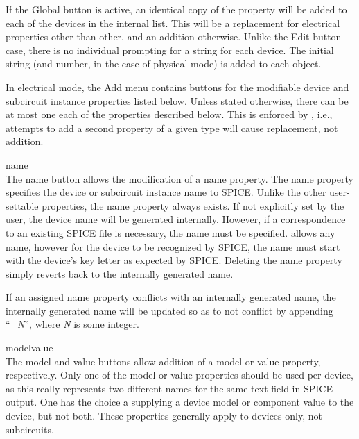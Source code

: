 If the {\cb Global} button is active, an identical copy of the
property will be added to each of the devices in the internal list. 
This will be a replacement for electrical properties other than {\et
other}, and an addition otherwise.  Unlike the {\cb Edit} button case,
there is no individual prompting for a string for each device.  The
initial string (and number, in the case of physical mode) is added to
each object.

In electrical mode, the {\cb Add} menu contains buttons for the
modifiable device and subcircuit instance properties listed below. 
Unless stated otherwise, there can be at most one each of the
properties described below.  This is enforced by {\Xic}, i.e.,
attempts to add a second property of a given type will cause
replacement, not addition.

\begin{description}
\item{\cb name}\\
The {\cb name} button allows the modification of a {\et name}
property.  The {\et name} property specifies the device or subcircuit
instance name to SPICE.  Unlike the other user-settable properties,
the {\et name} property always exists.  If not explicitly set by the
user, the device name will be generated internally.  However, if a
correspondence to an existing SPICE file is necessary, the name must
be specified.  {\Xic} allows any name, however for the device to be
recognized by SPICE, the name must start with the device's key letter
as expected by SPICE.  Deleting the {\et name} property simply reverts
back to the internally generated name.

If an assigned name property conflicts with an internally generated
name, the internally generated name will be updated so as to not
conflict by appending ``\_{\it N\/}'', where {\it N} is some integer.

\item{\cb model\newline\cb value}\\
The {\cb model} and {\cb value} buttons allow addition of a {\et
model} or {\et value} property, respectively.  Only one of the {\et
model} or {\et value} properties should be used per device, as this
really represents two different names for the same text field in SPICE
output.  One has the choice a supplying a device model or component
value to the device, but not both.  These properties generally apply
to devices only, not subcircuits.


\end{description}
